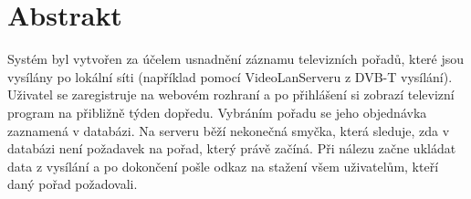 \documentclass[11pt,twoside,a4paper]{dp_format}%
\begin{document}
\chapter*{Abstrakt}
Systém byl vytvořen za účelem usnadnění záznamu televizních pořadů, které jsou vysílány po lokální síti (například pomocí VideoLanServeru z DVB-T vysílání). Uživatel se zaregistruje na webovém rozhraní a po přihlášení si zobrazí televizní program na přibližně týden dopředu. Vybráním pořadu se jeho objednávka zaznamená v databázi. Na serveru běží nekonečná smyčka, která sleduje, zda v databázi není požadavek na pořad, který právě začíná. Při nálezu začne ukládat data z vysílání a po dokončení pošle odkaz na stažení všem uživatelům, kteří daný pořad požadovali.
\cleardoublepage%

\tableofcontents
\cleardoublepage%

\listoffigures
{}
\cleardoublepage%

\listoftables
{}
\cleardoublepage%

\mainbodystarts







\cleardoublepage




\cleardoublepage

\appendix

\cleardoublepage


\cleardoublepage


\cleardoublepage


\cleardoublepage


\cleardoublepage
\end{document}
